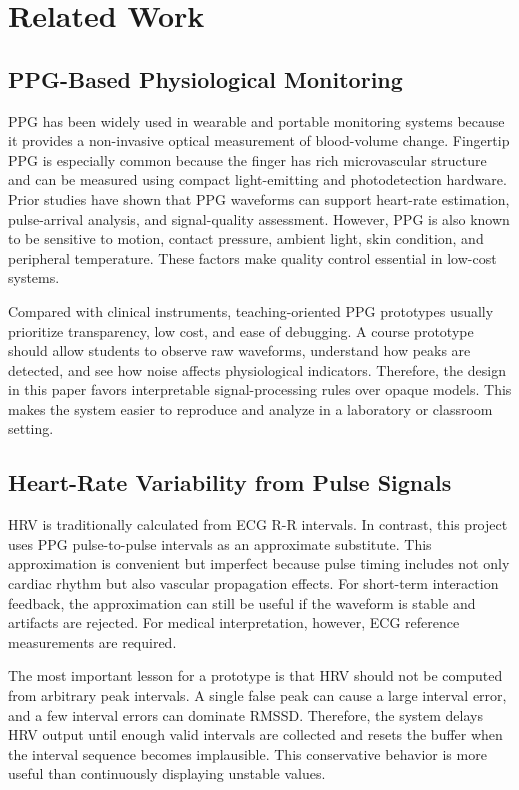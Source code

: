 \documentclass[10pt,conference]{IEEEtran}
\begin{document}
\section{Related Work}
\subsection{PPG-Based Physiological Monitoring}
PPG has been widely used in wearable and portable monitoring systems because it provides a non-invasive optical measurement of blood-volume change. Fingertip PPG is especially common because the finger has rich microvascular structure and can be measured using compact light-emitting and photodetection hardware. Prior studies have shown that PPG waveforms can support heart-rate estimation, pulse-arrival analysis, and signal-quality assessment. However, PPG is also known to be sensitive to motion, contact pressure, ambient light, skin condition, and peripheral temperature. These factors make quality control essential in low-cost systems.

Compared with clinical instruments, teaching-oriented PPG prototypes usually prioritize transparency, low cost, and ease of debugging. A course prototype should allow students to observe raw waveforms, understand how peaks are detected, and see how noise affects physiological indicators. Therefore, the design in this paper favors interpretable signal-processing rules over opaque models. This makes the system easier to reproduce and analyze in a laboratory or classroom setting.

\subsection{Heart-Rate Variability from Pulse Signals}
HRV is traditionally calculated from ECG R-R intervals. In contrast, this project uses PPG pulse-to-pulse intervals as an approximate substitute. This approximation is convenient but imperfect because pulse timing includes not only cardiac rhythm but also vascular propagation effects. For short-term interaction feedback, the approximation can still be useful if the waveform is stable and artifacts are rejected. For medical interpretation, however, ECG reference measurements are required.

The most important lesson for a prototype is that HRV should not be computed from arbitrary peak intervals. A single false peak can cause a large interval error, and a few interval errors can dominate RMSSD. Therefore, the system delays HRV output until enough valid intervals are collected and resets the buffer when the interval sequence becomes implausible. This conservative behavior is more useful than continuously displaying unstable values.
\end{document}
